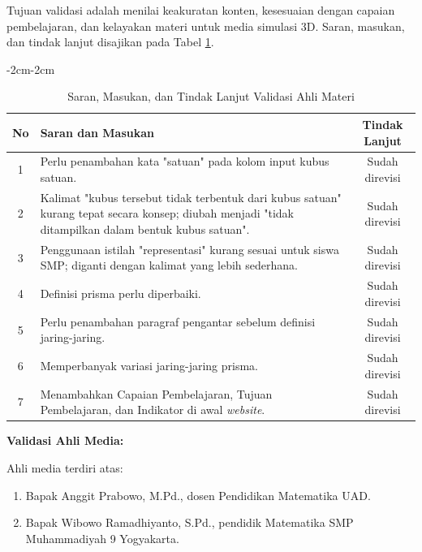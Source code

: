 \begin{enumerate}[leftmargin=1cm, label=\arabic*.]
\begin{enumerate}[label=\arabic*)]
        \hspace*{1cm}Tujuan validasi adalah menilai keakuratan konten, kesesuaian dengan capaian pembelajaran, dan kelayakan materi untuk media simulasi 3D. Saran, masukan, dan tindak lanjut disajikan pada Tabel \ref{tabel:validasimateri}.
        \begin{table}[H]
\begin{adjustwidth}{-2cm}{-2cm}
    \centering
    \caption{Saran, Masukan, dan Tindak Lanjut Validasi Ahli Materi}
    \label{tabel:validasimateri}
    \begin{tabular}{|c|p{9cm}|c|}
        \hline
        \textbf{No} & \textbf{Saran dan Masukan} & \textbf{Tindak Lanjut} \\
        \hline
        1 & Perlu penambahan kata "satuan" pada kolom input kubus satuan. & Sudah direvisi \\
        \hline
        2 & Kalimat "kubus tersebut tidak terbentuk dari kubus satuan" kurang tepat secara konsep; diubah menjadi "tidak ditampilkan dalam bentuk kubus satuan". & Sudah direvisi \\
        \hline
        3 & Penggunaan istilah "representasi" kurang sesuai untuk siswa SMP; diganti dengan kalimat yang lebih sederhana. & Sudah direvisi \\
        \hline
        4 & Definisi prisma perlu diperbaiki. & Sudah direvisi \\
        \hline
        5 & Perlu penambahan paragraf pengantar sebelum definisi jaring-jaring. & Sudah direvisi \\
        \hline
        6 & Memperbanyak variasi jaring-jaring prisma. & Sudah direvisi \\
        \hline
        7 & Menambahkan Capaian Pembelajaran, Tujuan Pembelajaran, dan Indikator di awal \textit{website}. & Sudah direvisi \\
        \hline
    \end{tabular}
\end{adjustwidth}
\end{table}
\newpage
        
        \textbf{Validasi Ahli Media:}
        
        \hspace*{1cm}Ahli media terdiri atas:
        \begin{enumerate}[leftmargin=*, label=--]
            \item Bapak Anggit Prabowo, M.Pd., dosen Pendidikan Matematika UAD.
            \item Bapak Wibowo Ramadhiyanto, S.Pd., pendidik Matematika SMP Muhammadiyah 9 Yogyakarta.
        \end{enumerate}
        

\end{enumerate}
\end{enumerate}
